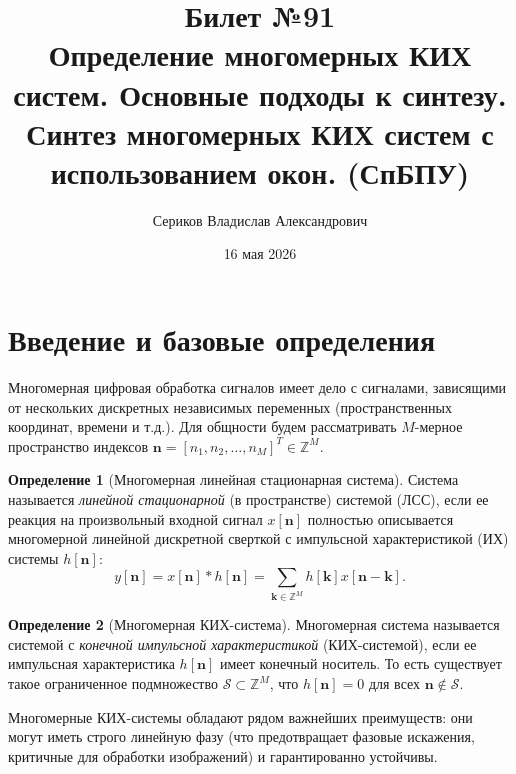 \documentclass[12pt, a4paper]{article}
\title{Билет №91 \\ \small Определение многомерных КИХ систем. Основные подходы к синтезу. Синтез многомерных КИХ систем с использованием окон. (СпБПУ)}
\author{Сериков Владислав Александрович}
\date{16 мая 2026}
\theoremstyle{definition}
\newtheorem{definition}{Определение}
\theoremstyle{plain}
\begin{document}
\maketitle
\tableofcontents
\newpage

\section{Введение и базовые определения}

Многомерная цифровая обработка сигналов имеет дело с сигналами, зависящими от нескольких дискретных независимых переменных (пространственных координат, времени и т.д.). Для общности будем рассматривать $M$-мерное пространство индексов $\mathbf{n} = [n_1, n_2, \dots, n_M]^T \in \mathbb{Z}^M$.

\begin{definition}[Многомерная линейная стационарная система]
Система называется \textit{линейной стационарной} (в пространстве) системой (ЛСС), если ее реакция на произвольный входной сигнал $x[\mathbf{n}]$ полностью описывается многомерной линейной дискретной сверткой с импульсной характеристикой (ИХ) системы $h[\mathbf{n}]$:
\begin{equation}
    y[\mathbf{n}] = x[\mathbf{n}] * h[\mathbf{n}] = \sum_{\mathbf{k} \in \mathbb{Z}^M} h[\mathbf{k}] x[\mathbf{n} - \mathbf{k}].
\end{equation}
\end{definition}

\begin{definition}[Многомерная КИХ-система]
Многомерная система называется системой с \textit{конечной импульсной характеристикой} (КИХ-системой), если ее импульсная характеристика $h[\mathbf{n}]$ имеет конечный носитель. То есть существует такое ограниченное подмножество $\mathcal{S} \subset \mathbb{Z}^M$, что $h[\mathbf{n}] = 0$ для всех $\mathbf{n} \notin \mathcal{S}$.
\end{definition}

Многомерные КИХ-системы обладают рядом важнейших преимуществ: они могут иметь строго линейную фазу (что предотвращает фазовые искажения, критичные для обработки изображений) и гарантированно устойчивы.
\end{document}
